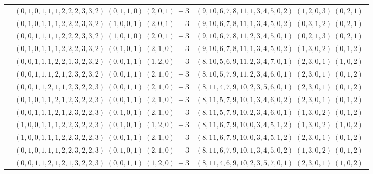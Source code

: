 \documentclass[11pt]{article}
\begin{document}
\begin{longtable}[l]{|c|c|c|}
 \cline{2-3} 
 & $(0 ,1 ,0 ,1 ,1 ,1 ,2 ,2 ,2 ,3 ,3 ,2) \;(0 ,1 ,1 ,0) \;(2 ,0 ,1) \;-3$ & $(9 ,10 ,6 ,7 ,8 ,11 ,1 ,3 ,4 ,5 ,0 ,2) \;(1 ,2 ,0 ,3) \;(0 ,2 ,1) \;$\\ 
 \cline{2-3} 
 & $(0 ,1 ,0 ,1 ,1 ,1 ,2 ,2 ,2 ,3 ,3 ,2) \;(1 ,0 ,0 ,1) \;(2 ,0 ,1) \;-3$ & $(9 ,10 ,6 ,7 ,8 ,11 ,1 ,3 ,4 ,5 ,0 ,2) \;(0 ,3 ,1 ,2) \;(0 ,2 ,1) \;$\\ 
 \cline{2-3} 
 & $(0 ,0 ,1 ,1 ,1 ,1 ,2 ,2 ,2 ,3 ,3 ,2) \;(1 ,0 ,1 ,0) \;(2 ,0 ,1) \;-3$ & $(9 ,10 ,6 ,7 ,8 ,11 ,2 ,3 ,4 ,5 ,0 ,1) \;(0 ,2 ,1 ,3) \;(0 ,2 ,1) \;$\\ 
 \cline{2-3} 
 & $(0 ,1 ,0 ,1 ,1 ,1 ,2 ,2 ,2 ,3 ,3 ,2) \;(0 ,1 ,0 ,1) \;(2 ,1 ,0) \;-3$ & $(9 ,10 ,6 ,7 ,8 ,11 ,1 ,3 ,4 ,5 ,0 ,2) \;(1 ,3 ,0 ,2) \;(0 ,1 ,2) \;$\\ 
 \cline{2-3} 
 & $(0 ,0 ,1 ,1 ,1 ,2 ,2 ,1 ,3 ,2 ,3 ,2) \;(0 ,0 ,1 ,1) \;(1 ,2 ,0) \;-3$ & $(8 ,10 ,5 ,6 ,9 ,11 ,2 ,3 ,4 ,7 ,0 ,1) \;(2 ,3 ,0 ,1) \;(1 ,0 ,2) \;$\\ 
 \cline{2-3} 
 & $(0 ,0 ,1 ,1 ,1 ,2 ,1 ,2 ,3 ,2 ,3 ,2) \;(0 ,0 ,1 ,1) \;(2 ,1 ,0) \;-3$ & $(8 ,10 ,5 ,7 ,9 ,11 ,2 ,3 ,4 ,6 ,0 ,1) \;(2 ,3 ,0 ,1) \;(0 ,1 ,2) \;$\\ 
 \cline{2-3} 
 & $(0 ,0 ,1 ,1 ,2 ,1 ,1 ,2 ,3 ,2 ,2 ,3) \;(0 ,0 ,1 ,1) \;(2 ,1 ,0) \;-3$ & $(8 ,11 ,4 ,7 ,9 ,10 ,2 ,3 ,5 ,6 ,0 ,1) \;(2 ,3 ,0 ,1) \;(0 ,1 ,2) \;$\\ 
 \cline{2-3} 
 & $(0 ,1 ,0 ,1 ,1 ,2 ,1 ,2 ,3 ,2 ,2 ,3) \;(0 ,0 ,1 ,1) \;(2 ,1 ,0) \;-3$ & $(8 ,11 ,5 ,7 ,9 ,10 ,1 ,3 ,4 ,6 ,0 ,2) \;(2 ,3 ,0 ,1) \;(0 ,1 ,2) \;$\\ 
 \cline{2-3} 
 & $(0 ,0 ,1 ,1 ,1 ,2 ,1 ,2 ,3 ,2 ,2 ,3) \;(0 ,1 ,0 ,1) \;(2 ,1 ,0) \;-3$ & $(8 ,11 ,5 ,7 ,9 ,10 ,2 ,3 ,4 ,6 ,0 ,1) \;(1 ,3 ,0 ,2) \;(0 ,1 ,2) \;$\\ 
 \cline{2-3} 
 & $(1 ,0 ,0 ,1 ,1 ,1 ,2 ,2 ,3 ,2 ,2 ,3) \;(0 ,1 ,0 ,1) \;(1 ,2 ,0) \;-3$ & $(8 ,11 ,6 ,7 ,9 ,10 ,0 ,3 ,4 ,5 ,1 ,2) \;(1 ,3 ,0 ,2) \;(1 ,0 ,2) \;$\\ 
 \cline{2-3} 
 & $(1 ,0 ,0 ,1 ,1 ,1 ,2 ,2 ,3 ,2 ,2 ,3) \;(0 ,0 ,1 ,1) \;(2 ,1 ,0) \;-3$ & $(8 ,11 ,6 ,7 ,9 ,10 ,0 ,3 ,4 ,5 ,1 ,2) \;(2 ,3 ,0 ,1) \;(0 ,1 ,2) \;$\\ 
 \cline{2-3} 
 & $(0 ,1 ,0 ,1 ,1 ,1 ,2 ,2 ,3 ,2 ,2 ,3) \;(0 ,1 ,0 ,1) \;(2 ,1 ,0) \;-3$ & $(8 ,11 ,6 ,7 ,9 ,10 ,1 ,3 ,4 ,5 ,0 ,2) \;(1 ,3 ,0 ,2) \;(0 ,1 ,2) \;$\\ 
 \cline{2-3} 
 & $(0 ,0 ,1 ,1 ,2 ,1 ,2 ,1 ,3 ,2 ,2 ,3) \;(0 ,0 ,1 ,1) \;(1 ,2 ,0) \;-3$ & $(8 ,11 ,4 ,6 ,9 ,10 ,2 ,3 ,5 ,7 ,0 ,1) \;(2 ,3 ,0 ,1) \;(1 ,0 ,2) \;$\\ 

\end{longtable}
\end{document}
